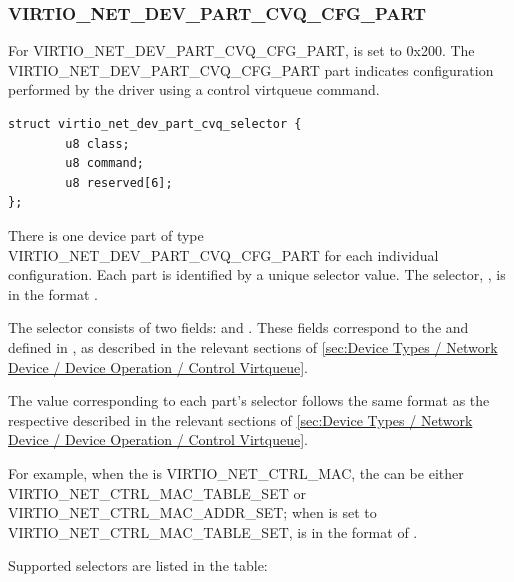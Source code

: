 \subsubsection{VIRTIO_NET_DEV_PART_CVQ_CFG_PART}\label{sec:Device Types / Network Device / Device parts / VIRTIO-NET-DEV-PART-CVQ-CFG-PART}

For VIRTIO_NET_DEV_PART_CVQ_CFG_PART,  is set to 0x200. The
VIRTIO_NET_DEV_PART_CVQ_CFG_PART part indicates configuration performed by the
driver using a control virtqueue command.

\begin{lstlisting}
struct virtio_net_dev_part_cvq_selector {
        u8 class;
        u8 command;
        u8 reserved[6];
};
\end{lstlisting}

There is one device part of type VIRTIO_NET_DEV_PART_CVQ_CFG_PART for each
individual configuration. Each part is identified by a unique selector value.
The selector, , is in the format
.

The selector consists of two fields:  and . These
fields correspond to the  and  defined in
, as described in the relevant sections of
\ref{sec:Device Types / Network Device / Device Operation / Control Virtqueue}.

The value corresponding to each part’s selector follows the same format as the
respective  described in the relevant sections of
\ref{sec:Device Types / Network Device / Device Operation / Control Virtqueue}.

For example, when the  is VIRTIO_NET_CTRL_MAC, the 
can be either VIRTIO_NET_CTRL_MAC_TABLE_SET or VIRTIO_NET_CTRL_MAC_ADDR_SET;
when  is set to VIRTIO_NET_CTRL_MAC_TABLE_SET, 
is in the format of .

Supported selectors are listed in the table:

